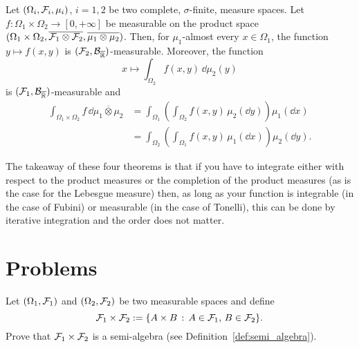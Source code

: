 \begin{theorem}
	Let $(\Omega_i, \mathcal F_i, \mu_i)$, $i=1,2$ be two complete, $\sigma$-finite, measure spaces. 
	Let $f : \Omega_1 \times \Omega_2 \to [0,+\infty]$ be measurable on the product space $(\Omega_1 \times \Omega_2, \overline{\mathcal F_1 \otimes \mathcal F_2}, \overline{\mu_1 \otimes \mu_2})$. Then, for $\mu_1$-almost every $x \in \Omega_1$, the function $y \mapsto f(x, y)$ is $(\mathcal F_2,\mathcal B_{\overline{\mathbb R}})$-measurable. Moreover, the function 
	\[
	x \mapsto \int_{\Omega_2} f(x,y)\, \dd \mu_2(y)
	\]
	is $(\mathcal F_1,\mathcal B_{\overline{\mathbb R}})$-measurable and
	\[
	\begin{split}
	\int_{\Omega_1 \times \Omega_2} f \,\dd \overline{\mu_1 \otimes \mu_2} 
	&= \int_{\Omega_1} \left( \int_{\Omega_2 } f(x,  y ) \,\mu_2(\dd y) \right) \mu_1(\dd x)\\
	&= \int_{\Omega_2} \left( \int_{\Omega_1} f(x, y)  \,\mu_1(\dd x) \right) \mu_2(\dd y).
	\end{split}
	\] 	
\end{theorem}

The takeaway of these four theorems is that if you have to integrate either with respect to the product measures or the completion of the product measures (as is the case for the Lebesgue measure) then, as long as your function is integrable (in the case of Fubini) or measurable (in the case of Tonelli), this can be done by iterative integration and the order does not matter.


\section{Problems}

\begin{problem}\label{prb:construction-product-measure}
Let $(\Omega_1, \mathcal F_1)$ and $(\Omega_2, \mathcal F_2)$ be two measurable spaces and define 
\[
	\mathcal F_1 \times \mathcal F_2 := \{A \times B \, : \, A \in \mathcal F_1, \, B \in \mathcal F_2\}.
\]
Prove that $\mathcal F_1 \times \mathcal F_2$ is a semi-algebra (see Definition~\ref{def:semi_algebra}).
\end{problem}

